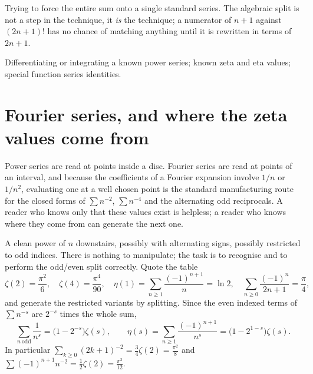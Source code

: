 \begin{trap}
Trying to force the entire sum onto a single standard series. The algebraic split is not a step in the technique, it \emph{is} the technique; a numerator of $n+1$ against $(2n+1)!$ has no chance of matching anything until it is rewritten in terms of $2n+1$.
\end{trap}

\begin{seealsob}Differentiating or integrating a known power series; known zeta and eta values; special function series identities.\end{seealsob}

\section{Fourier series, and where the zeta values come from}

Power series are read at points inside a disc. Fourier series are read at points of an interval, and because the coefficients of a Fourier expansion involve $1/n$ or $1/n^{2}$, evaluating one at a well chosen point is the standard manufacturing route for the closed forms of $\sum n^{-2}$, $\sum n^{-4}$ and the alternating odd reciprocals. A reader who knows only that these values exist is helpless; a reader who knows where they come from can generate the next one.

\cue A clean power of $n$ downstairs, possibly with alternating signs, possibly restricted to odd indices. There is nothing to manipulate; the task is to recognise and to perform the odd/even split correctly.
\method Quote the table
\[\zeta(2)=\frac{\pi^{2}}{6},\quad \zeta(4)=\frac{\pi^{4}}{90},\quad \eta(1)=\sum_{n\geq1}\frac{(-1)^{n+1}}{n}=\ln2,\quad \sum_{n\geq0}\frac{(-1)^{n}}{2n+1}=\frac{\pi}{4},\]
and generate the restricted variants by splitting. Since the even indexed terms of $\sum n^{-s}$ are $2^{-s}$ times the whole sum,
\[\sum_{n\ \mathrm{odd}}\frac{1}{n^{s}}=\bigl(1-2^{-s}\bigr)\zeta(s),\qquad \eta(s)=\sum_{n\geq1}\frac{(-1)^{n+1}}{n^{s}}=\bigl(1-2^{1-s}\bigr)\zeta(s).\]
In particular $\sum_{k\geq0}(2k+1)^{-2}=\tfrac34\zeta(2)=\tfrac{\pi^{2}}{8}$ and $\sum(-1)^{n+1}n^{-2}=\tfrac12\zeta(2)=\tfrac{\pi^{2}}{12}$.

